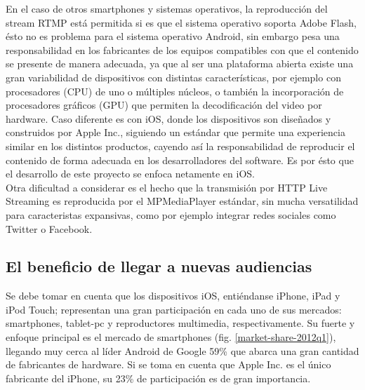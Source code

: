 	En el caso de otros smartphones y sistemas operativos, la reproducción del stream RTMP está permitida si es que el sistema operativo soporta Adobe Flash, ésto no es problema para el sistema operativo Android, sin embargo pesa una responsabilidad en los fabricantes de los equipos compatibles con que el contenido se presente de manera adecuada, ya que  al ser una plataforma abierta existe una gran variabilidad de dispositivos con distintas características, por ejemplo con procesadores (CPU) de uno o múltiples núcleos, o también la incorporación de procesadores gráficos (GPU) que permiten la decodificación del video por hardware. Caso diferente es con iOS, donde los dispositivos son diseñados y construidos por Apple Inc., siguiendo un estándar que permite una experiencia similar en los distintos productos, cayendo así la responsabilidad de reproducir el contenido de forma adecuada en los desarrolladores del software. Es por ésto que el desarrollo de este proyecto se enfoca netamente en iOS.\\

	Otra dificultad a considerar es el hecho que la transmisión por HTTP Live Streaming es reproducida por el MPMediaPlayer estándar, sin mucha versatilidad para caracteristas expansivas, como por ejemplo integrar redes sociales como Twitter o Facebook.\\



\subsection{El beneficio de llegar a nuevas audiencias}
Se debe tomar en cuenta que los dispositivos iOS, entiéndanse iPhone, iPad y iPod Touch; representan una gran participación en cada uno de sus mercados: smartphones, tablet-pc y reproductores  multimedia, respectivamente. Su fuerte y enfoque principal es el mercado de smartphones (fig. \ref{market-share-2012q1}), llegando muy cerca al líder Android de Google 59\% que abarca una gran cantidad de fabricantes de hardware. Si se toma en cuenta que Apple Inc. es el único fabricante del iPhone, su 23\% de participación es de gran importancia.\\

